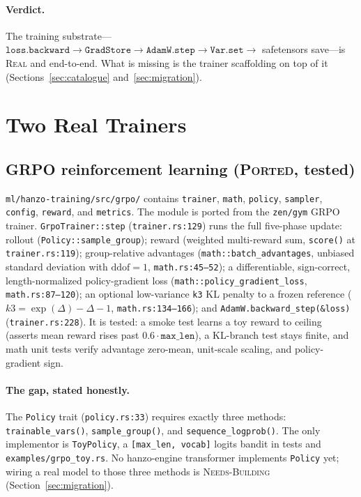 \documentclass[11pt]{article}
\begin{document}
\paragraph{Verdict.} The training substrate---$\texttt{loss.backward} \to \texttt{GradStore} \to \texttt{AdamW.step} \to \texttt{Var.set} \to$ safetensors save---is \textsc{Real} and end-to-end. What is missing is the trainer scaffolding on top of it (Sections~\ref{sec:catalogue} and~\ref{sec:migration}).

\section{Two Real Trainers}
\label{sec:trainers}

\subsection{GRPO reinforcement learning (\textsc{Ported}, tested)}

\texttt{ml/hanzo-training/src/grpo/} contains \texttt{trainer}, \texttt{math}, \texttt{policy}, \texttt{sampler}, \texttt{config}, \texttt{reward}, and \texttt{metrics}. The module is ported from the \texttt{zen/gym} GRPO~\cite{shao2024grpo} trainer. \texttt{GrpoTrainer::step} (\texttt{trainer.rs:129}) runs the full five-phase update: rollout (\texttt{Policy::sample\_group}); reward (weighted multi-reward sum, \texttt{score()} at \texttt{trainer.rs:119}); group-relative advantages (\texttt{math::batch\_advantages}, unbiased standard deviation with $\mathrm{ddof}=1$, \texttt{math.rs:45--52}); a differentiable, sign-correct, length-normalized policy-gradient loss (\texttt{math::policy\_gradient\_loss}, \texttt{math.rs:87--120}); an optional low-variance \texttt{k3} KL penalty to a frozen reference ($k3 = \exp(\Delta) - \Delta - 1$, \texttt{math.rs:134--166}); and \texttt{AdamW.backward\_step(\&loss)} (\texttt{trainer.rs:228}). It is tested: a smoke test learns a toy reward to ceiling (asserts mean reward rises past $0.6 \cdot \texttt{max\_len}$), a KL-branch test stays finite, and math unit tests verify advantage zero-mean, unit-scale scaling, and policy-gradient sign.

\paragraph{The gap, stated honestly.} The \texttt{Policy} trait (\texttt{policy.rs:33}) requires exactly three methods: \texttt{trainable\_vars()}, \texttt{sample\_group()}, and \texttt{sequence\_logprob()}. The only implementor is \texttt{ToyPolicy}, a \texttt{[max\_len, vocab]} logits bandit in tests and \texttt{examples/grpo\_toy.rs}. No hanzo-engine transformer implements \texttt{Policy} yet; wiring a real model to those three methods is \textsc{Needs-Building} (Section~\ref{sec:migration}).
\end{document}
